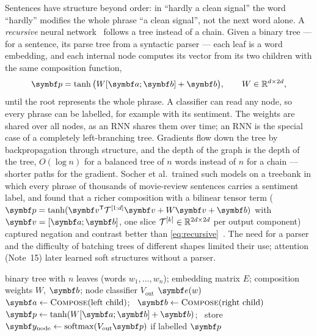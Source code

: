 \documentclass[11pt]{article}
\newcommand{\bv}{\vect{b}}
\newcommand{\yv}{\vect{y}}
\newcommand{\ev}{\vect{e}}
\newcommand{\softmax}{\operatorname{softmax}}
\begin{document}
Sentences have structure beyond order: in ``hardly a clean signal'' the word ``hardly'' modifies the whole phrase ``a
clean signal'', not the next word alone. A \emph{recursive}
neural network~\cite{socher2011} follows a tree instead of a chain. Given a binary tree --- for a sentence, its parse tree
from a syntactic parser --- each leaf is a word embedding, and each internal node computes its vector from its two
children with the same composition function,
\begin{equation}\label{eq:recursive}
  \vect{p} = \tanh\big(W[\vect{a}; \vect{b}] + \bv\big), \qquad W \in \R^{d \times 2d},
\end{equation}
until the root represents the whole phrase. A classifier can read any node, so every phrase can be labelled, for example
with its sentiment. The weights are shared over all nodes, as an RNN shares them over time; an RNN is the special case of a
completely left-branching tree. Gradients flow down the tree by backpropagation through structure, and the depth of the
graph is the depth of the tree, $O(\log n)$ for a balanced tree of $n$ words instead of $n$ for a chain --- shorter paths
for the gradient. Socher et al.\ trained such models on a treebank in which every phrase of thousands of movie-review
sentences carries a sentiment label, and found that a richer composition with a bilinear tensor term
($\vect{p} = \tanh(\vect{v}\T \mathcal{T}^{[1:d]}\vect{v} + W\vect{v} + \bv)$ with $\vect{v} = [\vect{a}; \vect{b}]$, one
slice $\mathcal{T}^{[k]} \in \mathbb{R}^{2d \times 2d}$ per output component) captured negation and contrast better than \eqref{eq:recursive}~\cite{socher2013}.
The need for a parser and the difficulty of batching trees of different shapes limited their use; attention (Note~15) later
learned soft structures without a parser.

\begin{algorithm}[htbp]
\caption{Recursive network: bottom-up composition over a binary tree}\label{alg:recursive}
\begin{algorithmic}[1]
\Require binary tree with $n$ leaves (words $w_1, \dots, w_n$); embedding matrix $E$; composition weights $W$, $\bv$; node classifier $V_{\mathrm{out}}$
   \Return $\ev(w)$ \EndIf
  \State $\vect{a} \gets \Call{Compose}{\text{left child}}$; \ $\vect{b} \gets \Call{Compose}{\text{right child}}$ 
  \State $\vect{p} \gets \tanh(W[\vect{a}; \vect{b}] + \bv)$; \ store $\yv_{\text{node}} \gets \softmax(V_{\mathrm{out}}\vect{p})$ if labelled
  \State \Return $\vect{p}$
\EndFunction
\end{algorithmic}
\end{algorithm}
\end{document}
